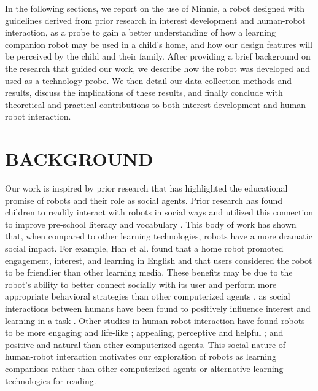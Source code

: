 \documentclass{sigchi}
\begin{document}


In the following sections, we report on the use of Minnie, a robot designed with guidelines derived from prior research in interest development and human-robot interaction, as a probe to gain a better understanding of how a learning companion robot may be used in a child's home, and how our design features will be perceived by the child and their family. After providing a brief background on the research that guided our work, we describe how the robot was developed and used as a technology probe. We then detail our data collection methods and results, discuss the implications of these results, and finally conclude with theoretical and practical contributions to both interest development and human-robot interaction.

\section{BACKGROUND}
Our work is inspired by prior research that has highlighted the educational promise of robots and their role as social agents. Prior research has found children to readily interact with robots in social ways and utilized this connection to improve pre-school literacy \cite{Kory:2014} and vocabulary \cite{Spaulding:2016}. This body of work has shown that, when compared to other learning technologies, robots have a more dramatic social impact. For example, Han et al. \cite{Han:2005} found that a home robot promoted engagement, interest, and learning in English and that users considered the robot to be friendlier than other learning media. These benefits may be due to the robot's ability to better connect socially with its user and perform more appropriate behavioral strategies than other computerized agents \cite{Brown:2013}, as social interactions between humans have been found to positively influence interest and learning in a task \cite{Sansone:2005}. Other studies in human-robot interaction have found robots to be more engaging and life-like \cite{Kiesler:2008}; appealing, perceptive and helpful \cite{Wainer:2007}; and positive and natural \cite{Bainbridge:2011} than other computerized agents. This social nature of human-robot interaction motivates our exploration of robots as learning companions rather than other computerized agents or alternative learning technologies for reading. 
\end{document}
